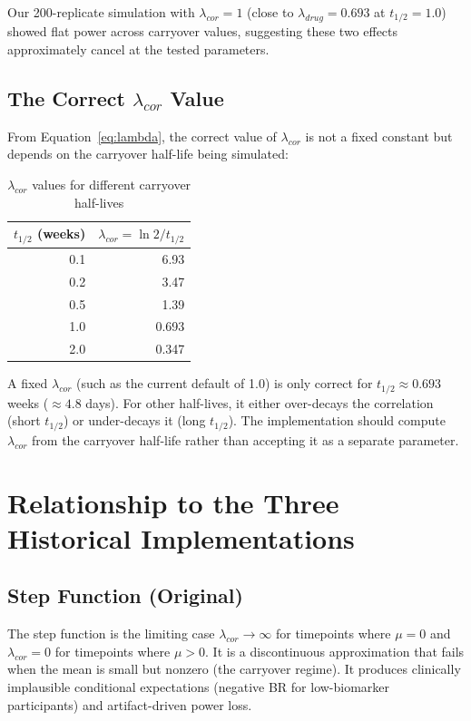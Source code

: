\documentclass[11pt]{article}
\begin{document}
Our 200-replicate simulation with $\lambda_{cor} = 1$
(close to $\lambda_{drug} = 0.693$ at $t_{1/2} = 1.0$)
showed flat power across carryover values, suggesting these
two effects approximately cancel at the tested parameters.

\subsection{The Correct $\lambda_{cor}$ Value}

From Equation~\ref{eq:lambda}, the correct value of
$\lambda_{cor}$ is not a fixed constant but depends on the
carryover half-life being simulated:

\begin{table}[h]
\centering
\caption{$\lambda_{cor}$ values for different carryover
  half-lives}
\begin{tabular}{rr}
\toprule
$t_{1/2}$ (weeks) & $\lambda_{cor} = \ln 2 / t_{1/2}$ \\
\midrule
0.1 & 6.93 \\
0.2 & 3.47 \\
0.5 & 1.39 \\
1.0 & 0.693 \\
2.0 & 0.347 \\
\bottomrule
\end{tabular}
\end{table}

A fixed $\lambda_{cor}$ (such as the current default of 1.0)
is only correct for $t_{1/2} \approx 0.693$ weeks
($\approx 4.8$ days). For other half-lives, it either
over-decays the correlation (short $t_{1/2}$) or
under-decays it (long $t_{1/2}$). The implementation
should compute $\lambda_{cor}$ from the carryover half-life
rather than accepting it as a separate parameter.

\section{Relationship to the Three Historical Implementations}

\subsection{Step Function (Original)}

The step function is the limiting case
$\lambda_{cor} \to \infty$ for timepoints where $\mu = 0$
and $\lambda_{cor} = 0$ for timepoints where $\mu > 0$.
It is a discontinuous approximation that fails when the
mean is small but nonzero (the carryover regime). It
produces clinically implausible conditional expectations
(negative BR for low-biomarker participants) and
artifact-driven power loss.
\end{document}
